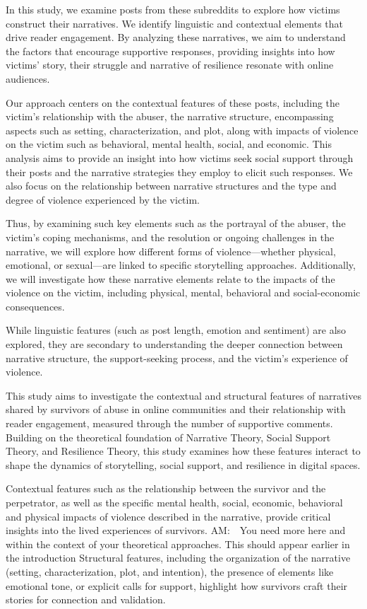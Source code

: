 \documentclass[11pt]{article}
\newcommand{\am}[1]{\textcolor{red!80!black!40}{{AM:~~#1}}}
\begin{document}
In this study, we examine posts from these subreddits to explore how victims construct their narratives. We identify linguistic and contextual elements that drive reader engagement. By analyzing these narratives, we aim to understand the factors that encourage supportive responses, providing insights into how victims' story, their struggle and narrative of resilience resonate with online audiences.

Our approach centers on the contextual features of these posts, including the victim's relationship with the abuser, the narrative structure, encompassing aspects such as setting, characterization, and plot, along with impacts of violence on the victim such as behavioral, mental health, social, and economic. 
This analysis aims to provide an insight into how victims seek social support through their posts and the narrative strategies they employ to elicit such responses.
We also focus on the relationship between narrative structures and the type and degree of violence experienced by the victim. 

Thus, by examining such key elements such as the portrayal of the abuser, the victim's coping mechanisms, and the resolution or ongoing challenges in the narrative, we will explore how different forms of violence—whether physical, emotional, or sexual—are linked to specific storytelling approaches. 
Additionally, we will investigate how these narrative elements relate to the impacts of the violence on the victim, including physical, mental, behavioral and social-economic consequences.

While linguistic features (such as post length, emotion and sentiment) are also explored, they are secondary to understanding the deeper connection between narrative structure, the support-seeking process, and the victim's experience of violence. 




This study aims to investigate the contextual and structural features of narratives shared by survivors of abuse in online communities and their relationship with reader engagement, measured through the number of supportive comments. 
Building on the theoretical foundation of Narrative Theory, Social Support Theory, and Resilience Theory, this study examines how these features interact to shape the dynamics of storytelling, social support, and resilience in digital spaces.

Contextual features such as the relationship between the survivor and the perpetrator, as well as the specific mental health, social, economic, behavioral and physical impacts of violence described in the narrative, provide critical insights into the lived experiences of survivors. \am{You need more here and within the context of your theoretical approaches. This should appear earlier in the introduction} 
Structural features, including the organization of the narrative (setting, characterization, plot, and intention), the presence of elements like emotional tone, or explicit calls for support, highlight how survivors craft their stories for connection and validation. 
\end{document}
